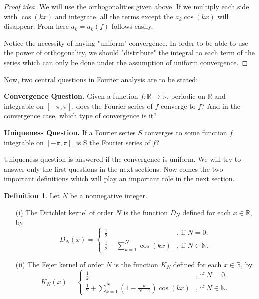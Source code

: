 \documentclass[12pt]{amsart}
\theoremstyle{definition}
\newtheorem{definition}[theorem]{Definition}
\begin{document}


\begin{proof}[Proof idea]
    We will use the orthogonalities given above. If we multiply each side with $\cos(kx)$ and integrate, all the terms except the $a_k \cos(kx)$ will disappear. From here $a_k = a_k(f)$ follows easily. \par
     Notice the necessity of having "uniform" convergence. In order to be able to use the power of orthogonality, we should "distribute" the integral to each term of the series which can only be done under the assumption of uniform convergence.
\end{proof}


    Now, two central questions in Fourier analysis are to be stated:
\vspace{6pt}

\textbf{Convergence Question.} Given a function \( f : \mathbb{R} \to \mathbb{R} \), periodic on \( \mathbb{R} \) and integrable on \( [-\pi, \pi] \), does the Fourier series of \( f \) converge to \( f \)? And in the convergence case, which type of convergence is it?

\vspace{6pt}


\textbf{Uniqueness Question.} If a Fourier series \( S \) converges to some function \( f \) integrable on \( [-\pi, \pi] \), is S the Fourier series of \(f\)?

\vspace{6pt}


Uniqueness question is answered if the convergence is uniform. We will try to answer only the first questions in the next sections. Now comes the two important definitions which will play an important role in the next section.\footnotemark{}




\begin{definition} Let $N$ be a nonnegative integer.
\begin{enumerate}
  \item[(i)] The Dirichlet kernel of order $N$ is the function $D_N$ defined for each $x \in \mathbb{R}$, by
  \[
  D_N(x) = \begin{cases}
            \frac{1}{2} & \text{, if } N = 0, \\
            \frac{1}{2}  + \sum_{k=1}^{N} \cos(kx) & \text{, if } N \in \mathbb{N}.
           \end{cases}
  \]

  \item[(ii)] The Fejer kernel of order $N$ is the function $K_N$ defined for each $x \in \mathbb{R}$, by
  \[
  K_N(x) = \begin{cases}
            \frac{1}{2} & \text{, if } N = 0, \\
            \frac{1}{2} + \sum_{k=1}^{N}\left( 1 - \frac{k}{N + 1} \right)\cos(kx) & \text{, if } N \in \mathbb{N}.
           \end{cases}
  \]
\end{enumerate}
\end{definition}
\end{document}
